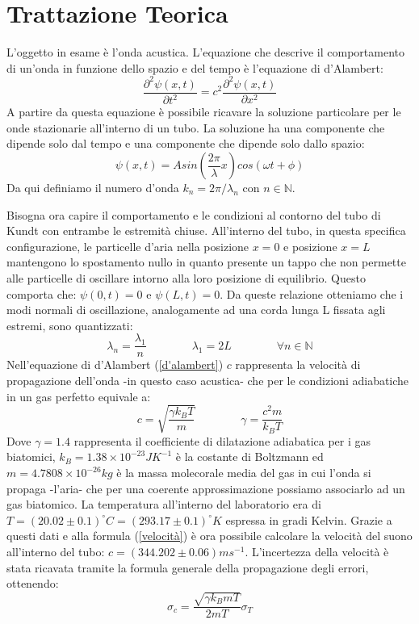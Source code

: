 \documentclass[11pt]{article}
\begin{document}
\section{Trattazione Teorica}
L'oggetto in esame è l'onda acustica. L'equazione che descrive il comportamento di un'onda in funzione dello spazio e del tempo è l'equazione di d'Alambert:
\begin{equation}
    \frac{\partial^2 \psi(x,t)}{\partial t^2} = c^2 \frac{\partial^2 \psi(x,t)}{\partial x^2}
    \label{d'alambert}
\end{equation}
A partire da questa equazione è possibile ricavare la soluzione particolare per le onde stazionarie all'interno di un tubo. La soluzione ha una componente che dipende solo dal tempo e una componente che dipende solo dallo spazio:
\begin{equation}
    \psi(x,t) = A sin\left(\frac{2 \pi}{\lambda}x\right)cos\left(\omega t + \phi\right)
    \label{stazio}
\end{equation}
Da qui definiamo il numero d'onda $k_n=2\pi/\lambda_n$ con $n \in \mathbb{N}$.

Bisogna ora capire il comportamento e le condizioni al contorno del tubo di Kundt con entrambe le estremità chiuse.
All'interno del tubo, in questa specifica configurazione, le particelle d'aria nella posizione $x=0$ e posizione $x=L$ mantengono lo spostamento nullo in quanto presente un tappo che non permette alle particelle di oscillare intorno alla loro posizione di equilibrio. Questo comporta che: $\psi(0,t)=0$ e $\psi(L,t)=0$. Da queste relazione otteniamo che i modi normali di oscillazione, analogamente ad una corda lunga L fissata agli estremi, sono quantizzati:
\begin{equation}
    \lambda_n = \frac{\lambda_1}{n} \qquad\qquad \lambda_1 = 2L \qquad\qquad \forall n \in \mathbb{N}
    \label{k}
\end{equation}
Nell'equazione di d'Alambert (\ref{d'alambert}) $c$ rappresenta la velocità di propagazione dell'onda -in questo caso acustica- che per le condizioni adiabatiche in un gas perfetto equivale a:
\begin{equation}
    c=\sqrt{\frac{\gamma k_B T}{m}} \qquad \qquad \gamma=\frac{c^2m}{k_BT}
    \label{velocità}
\end{equation}
Dove $\gamma = 1.4$ rappresenta il coefficiente di dilatazione adiabatica per i gas biatomici, $k_B = 1.38\times 10^{-23}JK^{-1}$ è la costante di Boltzmann ed $m = 4.7808\times 10^{-26} kg$ è la massa molecorale media del gas in cui l'onda si propaga -l'aria- che per una coerente approssimazione possiamo associarlo ad un gas biatomico. La temperatura all'interno del laboratorio era di $T = (20.02\pm 0.1)^{\circ}C = (293.17\pm 0.1)^{\circ}K$ espressa in gradi Kelvin.
Grazie a questi dati e alla formula (\ref{velocità}) è ora possibile calcolare la velocità del suono all'interno del tubo: $c = (344.202\pm 0.06 )ms^{-1}$.
L'incertezza della velocità è stata ricavata tramite la formula generale della propagazione degli errori, ottenendo:
\begin{equation}
    \sigma_c=\frac{\sqrt{\gamma k_B m T}}{2mT}\sigma_T
\end{equation}
\end{document}
